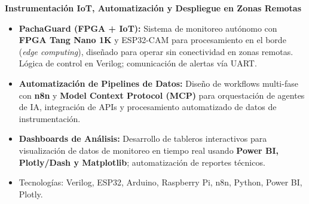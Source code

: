 \documentclass[10pt, a4paper]{article}
\begin{document}
\vspace{1mm}

\textbf{Instrumentación IoT, Automatización y Despliegue en Zonas Remotas}
\begin{itemize}
    \item \textbf{PachaGuard (FPGA + IoT):} Sistema de monitoreo autónomo con \textbf{FPGA Tang Nano 1K} y ESP32-CAM para procesamiento en el borde (\textit{edge computing}), diseñado para operar sin conectividad en zonas remotas. Lógica de control en Verilog; comunicación de alertas vía UART.
    \item \textbf{Automatización de Pipelines de Datos:} Diseño de workflows multi-fase con \textbf{n8n} y \textbf{Model Context Protocol (MCP)} para orquestación de agentes de IA, integración de APIs y procesamiento automatizado de datos de instrumentación.
    \item \textbf{Dashboards de Análisis:} Desarrollo de tableros interactivos para visualización de datos de monitoreo en tiempo real usando \textbf{Power BI, Plotly/Dash y Matplotlib}; automatización de reportes técnicos.
    \item Tecnologías: Verilog, ESP32, Arduino, Raspberry Pi, n8n, Python, Power BI, Plotly.
\end{itemize}

\end{document}
